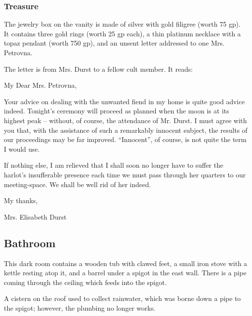 \subsubsection*{Treasure}
\begin{readout}
  The jewelry box on the vanity is made of silver with gold filigree (worth 75 gp). It contains three gold rings
  (worth 25 gp each), a thin platinum necklace with a topaz pendant (worth 750 gp), and an unsent letter
  addressed to one Mrs. Petrovna.
\end{readout}
The letter is from Mrs. Durst to a fellow cult member. It reads:
\begin{handout}
  My Dear Mrs. Petrovna,
  
  Your advice on dealing with the unwanted fiend in my home is quite good advice indeed. Tonight's ceremony
  will proceed as planned when the moon is at its highest peak -- without, of course, the attendance of
  Mr. Durst. I must agree with you that, with the assistance of such a remarkably innocent subject, the results
  of our proceedings may be far improved. ``Innocent'', of course, is not quite the term I would use.
  
  If nothing else, I am relieved that I shall soon no longer have to suffer the harlot's insufferable presence
  each time we must pass through her quarters to our meeting-space. We shall be well rid of her indeed.
  
  My thanks,
  
  Mrs. Elisabeth Durst
\end{handout}

\begin{arealinks}
\end{arealinks}


\pagebreak
\subsection{Bathroom}
\label{sec:Bathroom}
\begin{readout}
  This dark room contains a wooden tub with clawed feet, a small iron stove with a kettle resting atop it,
  and a barrel under a spigot in the east wall. There is a pipe coming through the ceiling which feeds into
  the spigot.
\end{readout}
A cistern on the roof used to collect rainwater, which was borne down a pipe to the spigot; however, the
plumbing no longer works.

\begin{arealinks}
\end{arealinks}


